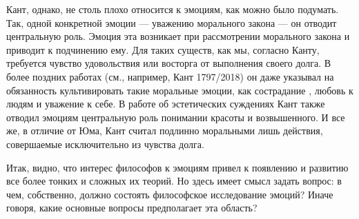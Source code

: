 \documentclass[11pt]{book}
\begin{document}
Кант, однако, не столь плохо относится к эмоциям, как можно было подумать. Так, одной конкретной эмоции --- уважению морального закона --- он отводит центральную роль. Эмоция эта возникает при рассмотрении морального закона и приводит к подчинению ему. Для таких существ, как мы, согласно Канту, требуется чувство удовольствия или восторга от выполнения своего долга. В более поздних работах (см., например, Кант 1797/2018) он даже указывал на обязанность культивировать такие моральные эмоции, как сострадание , любовь к людям и уважение к себе. В работе об эстетических суждениях Кант также отводил эмоциям центральную роль понимании красоты и возвышенного. И все же, в отличие от Юма, Кант считал подлинно моральными лишь действия, совершаемые исключительно из чувства долга.

Итак, видно, что интерес философов к эмоциям привел к появлению и развитию все более тонких и сложных их теорий. Но здесь имеет смысл задать вопрос: в чем, собственно, должно состоять философское исследование эмоций? Иначе говоря, какие основные вопросы предполагает эта область?
\end{document}
